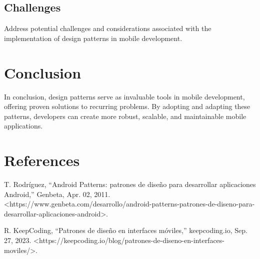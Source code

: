 \documentclass[conference]{IEEEtran}
\begin{document}
	\subsection{Challenges}
	Address potential challenges and considerations associated with the implementation of design patterns in mobile development.
	
	\section{Conclusion}
	In conclusion, design patterns serve as invaluable tools in mobile development, offering proven solutions to recurring problems. By adopting and adapting these patterns, developers can create more robust, scalable, and maintainable mobile applications.
	
	\section{References}
	\begin{thebibliography}{1}
		 T. Rodríguez, “Android Patterns: patrones de diseño para desarrollar aplicaciones Android,” Genbeta, Apr. 02, 2011. \textless https://www.genbeta.com/desarrollo/android-patterns-patrones-de-diseno-para-desarrollar-aplicaciones-android\textgreater.
		
		 R. KeepCoding, “Patrones de diseño en interfaces móviles,” keepcoding.io, Sep. 27, 2023. \textless https://keepcoding.io/blog/patrones-de-diseno-en-interfaces-moviles/\textgreater.
	\end{thebibliography}
	
\end{document}
